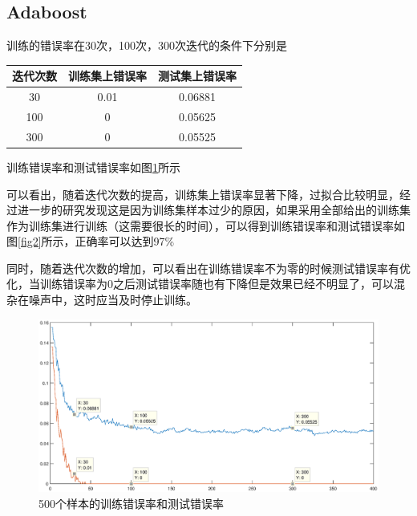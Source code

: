 \documentclass[UTF8,a4paper]{paper}
\begin{document}
\subsection{Adaboost}
训练的错误率在30次，100次，300次迭代的条件下分别是
\begin{table}
\centering
\begin{tabular}{|c|c|c|}
\hline
迭代次数&训练集上错误率&测试集上错误率\\
\hline
30&0.01&0.06881\\
\hline
100&0&0.05625\\
\hline
300&0&0.05525\\
\hline
\end{tabular}
\end{table}
训练错误率和测试错误率如图\ref{fig1}所示

可以看出，随着迭代次数的提高，训练集上错误率显著下降，过拟合比较明显，经过进一步的研究发现这是因为训练集样本过少的原因，如果采用全部给出的训练集作为训练集进行训练（这需要很长的时间），可以得到训练错误率和测试错误率如图\ref{fig2}所示，正确率可以达到97\%

同时，随着迭代次数的增加，可以看出在训练错误率不为零的时候测试错误率有优化，当训练错误率为0之后测试错误率随也有下降但是效果已经不明显了，可以混杂在噪声中，这时应当及时停止训练。

\begin{figure}
\centering
\includegraphics[width=\textwidth]{500trained.eps}
\caption{500个样本的训练错误率和测试错误率}
\label{fig1}
\end{figure}
\end{document}
